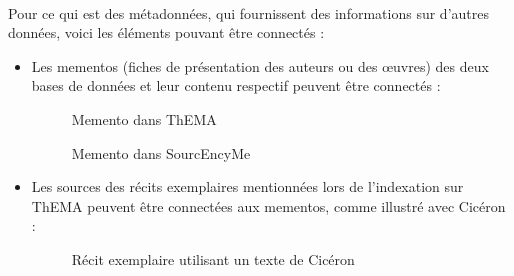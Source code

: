\

Pour ce qui est des métadonnées, qui fournissent des informations sur d'autres données, voici les éléments pouvant être connectés : \\

\begin{itemize} 
	\item Les mementos (fiches de présentation des auteurs ou des œuvres) des deux bases de données et leur contenu respectif peuvent être connectés : \\
	
	\begin{figure}[H]
		\centering
		\caption{Memento dans ThEMA}
	\end{figure}
	
	\begin{figure}[H]
		\centering
		\caption{Memento dans SourcEncyMe}
	\end{figure}
	
	\item Les sources des récits exemplaires mentionnées lors de l'indexation sur ThEMA peuvent être connectées aux mementos, comme illustré avec Cicéron : \\

	\begin{figure}[H]
		\centering
		\caption{Récit exemplaire utilisant un texte de Cicéron}
	\end{figure}


\end{itemize}
